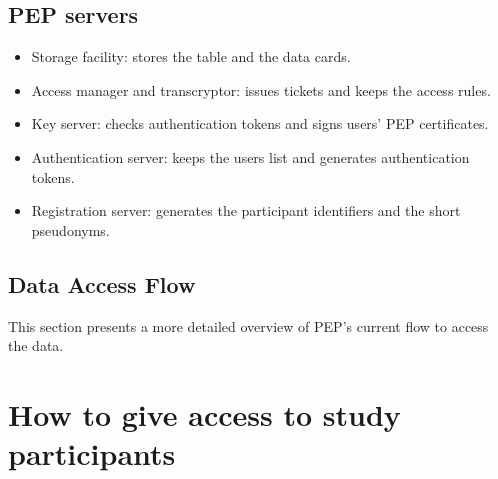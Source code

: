 \documentclass{report}
\begin{document}
\subsection{PEP servers}
\begin{itemize}
		\item Storage facility: stores the table and the data cards.
		\item Access manager and transcryptor: issues tickets and keeps the access rules.
		\item Key server: checks authentication tokens and signs users' PEP certificates.
		\item Authentication server: keeps the users list and generates authentication tokens. 
		\item Registration server: generates the participant identifiers and the short pseudonyms.
\end{itemize}

\subsection{Data Access Flow}
This section presents a more detailed overview of PEP's current flow to access the data. 

\section{How to give access to study participants}
\end{document}
